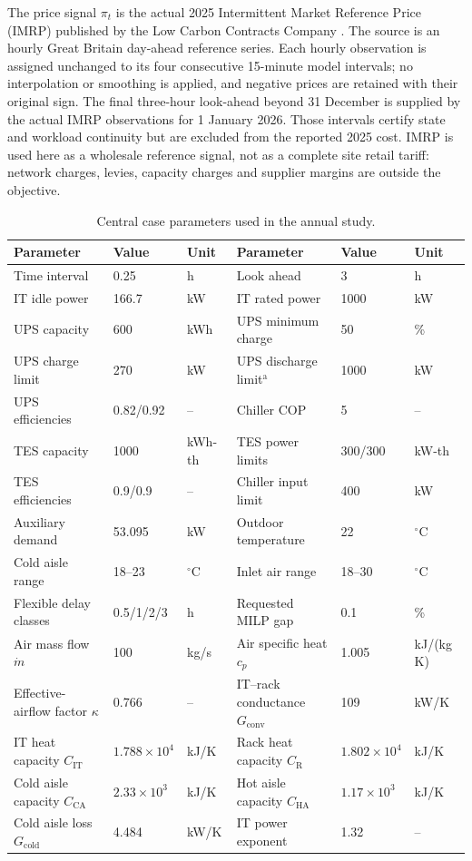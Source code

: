 The price signal $\pi_t$ is the actual 2025 Intermittent Market Reference Price
(IMRP) published by the Low Carbon Contracts Company \cite{lccc_imrp_actuals}.
The source is an hourly Great Britain day-ahead reference series. Each hourly
observation is assigned unchanged to its four consecutive 15-minute model
intervals; no interpolation or smoothing is applied, and negative prices are
retained with their original sign. The final three-hour look-ahead beyond
31 December is supplied by the actual IMRP observations for 1 January 2026.
Those intervals certify state and workload continuity but are excluded from the
reported 2025 cost. IMRP is used here as a wholesale reference signal, not as a
complete site retail tariff: network charges, levies, capacity charges and
supplier margins are outside the objective.

\begin{table}[!t]
\centering
\caption{Central case parameters used in the annual study.}
\label{tab:central-parameters}
\renewcommand{\arraystretch}{1.08}
\begin{tabular}{@{}llllll@{}}
\toprule
Parameter & Value & Unit & Parameter & Value & Unit \\
\midrule
Time interval & 0.25 & h & Look ahead & 3 & h \\
IT idle power & 166.7 & kW & IT rated power & 1000 & kW \\
UPS capacity & 600 & kWh & UPS minimum charge & 50 & \% \\
UPS charge limit & 270 & kW & UPS discharge limit$^{\mathrm{a}}$ & 1000 & kW \\
UPS efficiencies & 0.82/0.92 & -- & Chiller COP & 5 & -- \\
TES capacity & 1000 & kWh-th & TES power limits & 300/300 & kW-th \\
TES efficiencies & 0.9/0.9 & -- & Chiller input limit & 400 & kW \\
Auxiliary demand & 53.095 & kW & Outdoor temperature & 22 & $^{\circ}$C \\
Cold aisle range & 18--23 & $^{\circ}$C & Inlet air range & 18--30 & $^{\circ}$C \\
Flexible delay classes & 0.5/1/2/3 & h & Requested MILP gap & 0.1 & \% \\
\midrule
Air mass flow $\dot m$ & 100 & kg/s & Air specific heat $c_p$ & 1.005 & kJ/(kg\,K) \\
Effective-airflow factor $\kappa$ & 0.766 & -- & IT--rack conductance $G_{\mathrm{conv}}$ & 109 & kW/K \\
IT heat capacity $C_{\mathrm{IT}}$ & $1.788\times10^{4}$ & kJ/K & Rack heat capacity $C_{\mathrm{R}}$ & $1.802\times10^{4}$ & kJ/K \\
Cold aisle capacity $C_{\mathrm{CA}}$ & $2.33\times10^{3}$ & kJ/K & Hot aisle capacity $C_{\mathrm{HA}}$ & $1.17\times10^{3}$ & kJ/K \\
Cold aisle loss $G_{\mathrm{cold}}$ & 4.484 & kW/K & IT power exponent & 1.32 & -- \\
\bottomrule
\end{tabular}


\end{table}
